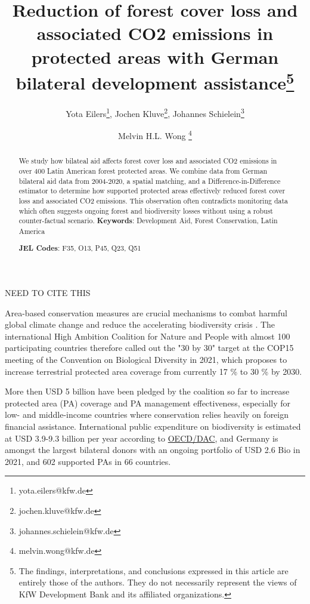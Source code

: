 \documentclass{article}
\title{Reduction of forest cover loss and associated CO2 emissions in protected areas with German bilateral development assistance\thanks{The findings, interpretations, and conclusions expressed in this article are entirely those of the authors. They do not necessarily represent the views of KfW Development Bank and its affiliated organizations.}}
\author{Yota Eilers\thanks{yota.eilers@kfw.de}, Jochen Kluve\thanks{jochen.kluve@kfw.de}, Johannes Schielein\thanks{johannes.schielein@kfw.de} \and Melvin H.L. Wong \thanks{melvin.wong@kfw.de}}
\begin{document}
%
\maketitle
\begin{abstract}
We study how bilateal aid affects forest cover loss and associated CO2 emissions in over 400 Latin American forest protected areas. We combine data from German bilateral aid data from 2004-2020, a spatial matching, and a Difference-in-Difference estimator to determine how supported protected areas effectively reduced forest cover loss and associated CO2 emissions. This observation often contradicts monitoring data which often suggests ongoing forest and biodiversity losses without using a robust counter-factual scenario.
                               \vspace{0.5cm}
                               \noindent\textbf{Keywords}: Development Aid, Forest Conservation, Latin America%
                               
                               \textbf{JEL Codes}: F35, O13, P45, Q23, Q51
                               
                               \vspace{0.5cm}
                \end{abstract}
                
                
                
NEED TO CITE THIS \citep{black2022counterfactual}


Area-based conservation measures are crucial mechanisms to combat harmful global climate change and reduce the accelerating biodiversity crisis \citep{shukla2019climate, diaz2019global}. The international  High Ambition Coalition for Nature and People with almost 100 participating countries therefore called out the "30 by 30" target at the COP15 meeting of the Convention on Biological Diversity in 2021, which proposes to increase terrestrial protected area coverage from currently 17 \% to 30 \% by 2030.

More then USD 5 billion have been pledged by the coalition so far to increase protected area (PA) coverage and PA management effectiveness, especially for low- and middle-income countries where conservation relies heavily on foreign financial assistance. International public expenditure on biodiversity is estimated at USD 3.9-9.3 billion per year according to \href{https://www.oecd.org/environment/resources/biodiversity/report-a-comprehensive-overview-of-global-biodiversity-finance.pdf}{OECD/DAC}, and Germany is amongst the largest bilateral donors with an ongoing portfolio of USD 2.6 Bio in 2021, and 602 supported PAs in 66 countries.
\end{document}
